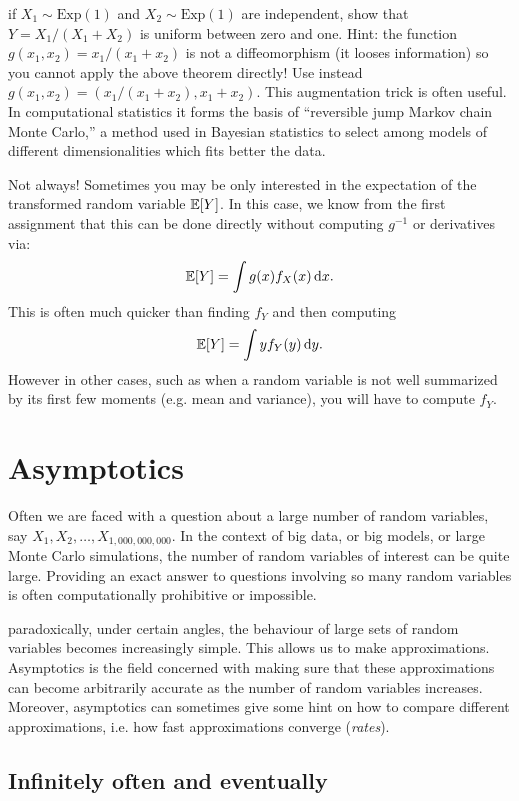 \documentclass{article}
\begin{document}
 if $X_1 \sim \text{Exp}(1)$ and $X_2 \sim \text{Exp}(1)$ are independent, show that $Y = X_1 / (X_1 + X_2)$ is uniform between zero and one.  Hint: the function $g(x_1, x_2) = x_1 / (x_1 + x_2)$ is not a diffeomorphism (it looses information) so you cannot apply the above theorem directly! Use instead $g(x_1, x_2) = (x_1 / (x_1 + x_2), x_1 + x_2)$. This augmentation trick is often useful. In computational statistics it forms the basis of ``reversible jump Markov chain Monte Carlo,'' a method used in Bayesian statistics to select among models of different dimensionalities which fits better the data.

 Not always! Sometimes you may be only interested in the expectation of the transformed random variable ${\mathbb E}[Y]$. In this case, we know from the first assignment that this can be done directly without computing $g^{-1}$ or derivatives via:
\[ {\mathbb E}[Y] = \int g(x) f_X(x) \,\mathrm{d} x. \]
This is often much quicker than finding $f_Y$ and then computing
\[ {\mathbb E}[Y] = \int y f_Y(y) \,\mathrm{d} y. \]
However in other cases, such as when a random variable is not well summarized by its first few moments (e.g. mean and variance), you will have to compute $f_Y$.


\section{Asymptotics}

Often we are faced with a question about a large number of random variables, say $X_1, X_2, \dots, X_{1,000,000,000}$. In the context of big data, or big models, or large Monte Carlo simulations, the number of random variables of interest can be quite large. Providing an exact answer to questions involving so many random variables is often  computationally prohibitive or impossible. 

 paradoxically, under certain angles, the behaviour of large sets of random variables becomes increasingly simple. This allows us to make approximations. Asymptotics is the field concerned with making sure that these approximations can become arbitrarily accurate as the number of random variables increases. Moreover, asymptotics can sometimes give some hint on how to compare different approximations, i.e. how fast approximations converge (\emph{rates}). 


\subsection{Infinitely often and eventually}\label{sec:io-ev}
\end{document}
